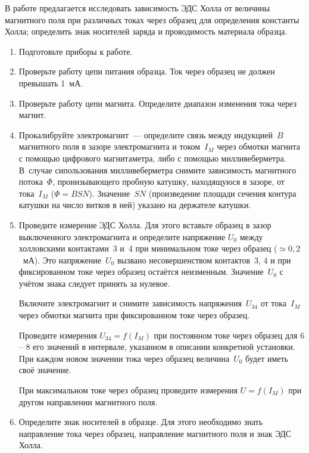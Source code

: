 \begin{lab:task}

В работе предлагается исследовать зависимость ЭДС Холла от величины магнитного
поля при различных токах через образец для определения константы Холла;
определить знак носителей заряда и проводимость материала образца.

\begin{enumerate}
\item{ Подготовьте приборы к работе.}

\item{ Проверьте работу цепи питания образца. Ток через образец не должен
превышать 1~мА.}

\item{ Проверьте работу цепи магнита. Определите диапазон изменения тока через
магнит.}

\item{ Прокалибруйте электромагнит~--- определите связь между индукцией~$B$
магнитного поля в зазоре электромагнита и током~$I_M$ через обмотки магнита с
помощью цифрового магнитаметра, либо с помощью милливеберметра. В~случае
сипользования милливеберметра снимите зависимость магнитного потока~$\Phi$,
пронизывающего пробную катушку, находящуюся в зазоре, от тока~$I_M$
($\Phi=BSN$). Значение~$SN$ (произведение площади сечения контура катушки на
число витков в ней) указано на держателе катушки.}

\item{ Проведите измерение ЭДС Холла. Для этого вставьте образец в зазор
выключенного электромагнита и определите напряжение $U_0$ между холловскими
контактами~3 и~4 при минимальном токе через образец ($\simeq 0,2$~мА). Это
напряжение~$U_0$ вызвано несовершенством контактов~3, 4 и при фиксированном токе
через образец остаётся неизменным. Значение~$U_0$ с учётом знака следует принять
за нулевое.

Включите электромагнит и снимите зависимость напряжения~$U_{34}$ от тока~$I_M$
через обмотки магнита при фиксированном токе через образец.

Проведите измерения $U_{34}=f(I_{M})$ при постоянном токе через образец для 6 --
8 его значений в интервале, указанном в описании конкретной установки. При
каждом новом значении тока через образец величина~$U_0$ будет иметь своё
значение.

При максимальном токе через образец проведите измерения $U=f(I_{M})$ при другом
направлении магнитного поля.}

\item{ Определите знак носителей в образце. Для этого необходимо знать
направление тока через образец, направление магнитного поля и знак ЭДС Холла.

}
\end{enumerate}
\end{lab:task}
